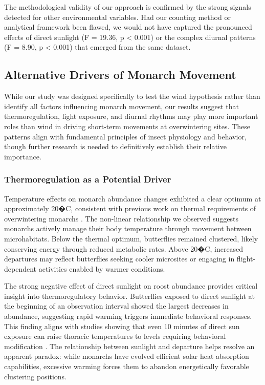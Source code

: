 The methodological validity of our approach is confirmed by the strong signals detected for other environmental variables. Had our counting method or analytical framework been flawed, we would not have captured the pronounced effects of direct sunlight (F = 19.36, p < 0.001) or the complex diurnal patterns (F = 8.90, p < 0.001) that emerged from the same dataset.

\subsection{Alternative Drivers of Monarch Movement}

While our study was designed specifically to test the wind hypothesis rather than identify all factors influencing monarch movement, our results suggest that thermoregulation, light exposure, and diurnal rhythms may play more important roles than wind in driving short-term movements at overwintering sites. These patterns align with fundamental principles of insect physiology and behavior, though further research is needed to definitively establish their relative importance.

\subsubsection{Thermoregulation as a Potential Driver}

Temperature effects on monarch abundance changes exhibited a clear optimum at approximately 20�C, consistent with previous work on thermal requirements of overwintering monarchs \autocite{masters_thermal_1988}. The non-linear relationship we observed suggests monarchs actively manage their body temperature through movement between microhabitats. Below the thermal optimum, butterflies remained clustered, likely conserving energy through reduced metabolic rates. Above 20�C, increased departures may reflect butterflies seeking cooler microsites or engaging in flight-dependent activities enabled by warmer conditions.

The strong negative effect of direct sunlight on roost abundance provides critical insight into thermoregulatory behavior. Butterflies exposed to direct sunlight at the beginning of an observation interval showed the largest decreases in abundance, suggesting rapid warming triggers immediate behavioral responses. This finding aligns with studies showing that even 10 minutes of direct sun exposure can raise thoracic temperatures to levels requiring behavioral modification \autocite{masters_thermal_1988}. The relationship between sunlight and departure helps resolve an apparent paradox: while monarchs have evolved efficient solar heat absorption capabilities, excessive warming forces them to abandon energetically favorable clustering positions.

